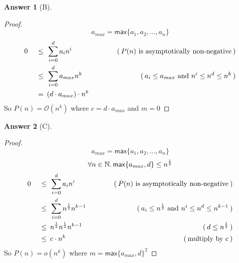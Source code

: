 \documentclass{article}
\theoremstyle{definition}
\newtheorem*{answer}{Answer}
\newcommand{\evidence}[1]{\ensuremath{\hspace{3em} (\hspace{0.2em} \text{#1} \hspace{0.2em})}}
\newcommand{\asymptotic}[3]{\ensuremath{#2 = #1(#3)}}
\newcommand{\bigO}[2]{\asymptotic{\mathcal{O}}{#1}{#2}}
\newcommand{\littleO}[2]{\asymptotic{o}{#1}{#2}}
\newcommand{\relation}[1]{\ensuremath{\hspace{0.2em} {{} #1 {}} \hspace{0.2em}}}
\newcommand{\equal}{\relation{=}}
\newcommand{\lesseq}{\relation{\le}}
\newcommand{\quantify}[2]{\ensuremath{\forall #1 \in \mathbb{#2}. \hspace{0.2em}}}
\newcommand{\maxSet}[1]{\ensuremath{\mathsf{max}\{#1\}}}
\begin{document}
\begin{answer}[B]
  \hfill
  \begin{proof}
    \begin{equation*}
    a_{max} = \maxSet{a_1, a_2, ..., a_n}
    \end{equation*}
    \begin{alignat*}{4}
      & 0  & \lesseq & \sum_{i=0}^{d}{a_i n^{i}} & \evidence{$P(n)$ is asymptotically non-negative} \\
      & {} & \lesseq & \sum_{i=0}^{d}{a_{max} n^{k}} & \evidence{$a_{i} \le a_{max}$ and $n^{i} \le n^{d} \le n^{k}$} \\
      & {} & \equal  & (d \cdot a_{max}) \cdot n^{k} & {}
    \end{alignat*}
    So $\bigO{P(n)}{n^{k}}$ where $c = d \cdot a_{max}$ and $m = 0$ \qedhere
  \end{proof}
\end{answer}

\begin{answer}[C]
  \hfill
  \begin{proof}

    \begin{equation*}
      a_{max} = \maxSet{a_1, a_2, ..., a_n}
    \end{equation*}
    \begin{equation*}
      \quantify{n}{N} \maxSet{a_{max}, d} \le n^{\frac{1}{2}}
    \end{equation*}
    \begin{alignat*}{4}
      & 0  & \lesseq & \sum_{i=0}^{d}{a_i n^{i}}             & \evidence{$P(n)$ is asymptotically non-negative} \\
      & {} & \lesseq & \sum_{i=0}^{d}{n^{\frac{1}{2}} n^{k-1}} & \evidence{$a_i \le n^{\frac{1}{2}}$ and $n^{i} \le n^{d} \le n^{k-1} $} \\
      & {} & \lesseq & n^{\frac{1}{2}} n^{\frac{1}{2}} n^{k-1}  & \evidence{$d \le n^{\frac{1}{2}}$} \\
      & {} & \lesseq & c \cdot n^{k}                        & \evidence{multiply by c}
    \end{alignat*}
    So $\littleO{P(n)}{n^{k}}$ where $m = {\maxSet{a_{max},d}}^2$ \qedhere
  \end{proof}
\end{answer}
\end{document}
